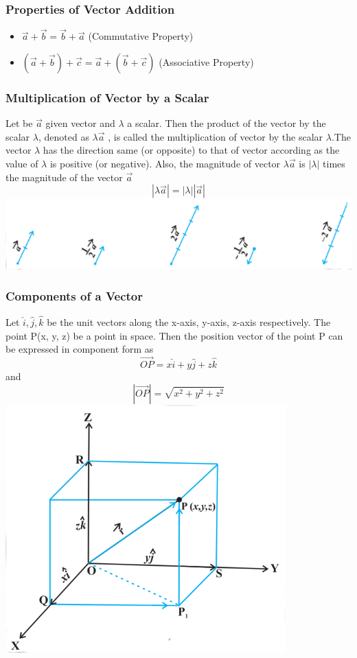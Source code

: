\documentclass[12pt]{article}
\begin{document}
\begin{multicols*}{2}
\subsubsection*{Properties of Vector Addition}
\begin{itemize}
    \item $\vec{a}+\vec{b}=\vec{b}+\vec{a}$ (Commutative Property)
    \item $ (\vec{a} + \vec{b})+\vec{c}=\vec{a}+(\vec{b}+\vec{c})$ (Associative Property)
\end{itemize}

\subsubsection*{Multiplication of Vector by a Scalar}
Let be $\vec{a}$ given vector and $\lambda$ a scalar. Then the product of the vector by the scalar
$\lambda$, denoted as $\lambda \vec{a}$ , is called the multiplication of vector by the scalar $\lambda$.The vector $\lambda$ has the direction same (or
opposite) to that of vector according as the value of $\lambda$ is positive (or negative). Also,
the magnitude of vector $\lambda \vec{a}$ is $| \lambda |$ times the magnitude of the vector $\vec{a}$ $$|\lambda \vec{a}|=|\lambda||\vec{a}|$$
\includegraphics*[scale=0.37]{7.png}

\subsubsection*{Components of a Vector}
Let $\hat{i}, \hat{j}, \hat{k}$ be the unit vectors along the x-axis, y-axis, z-axis respectively. The point P(x, y, z) be a point in space. Then the position vector of the point P can be expressed in component form as $$\vec{OP}=x \hat{i}+y \hat{j}+z \hat{k}$$ and $$|\vec{OP}|=\sqrt{x^2+ y^2+z^2}$$
\includegraphics*[scale=0.5]{8.png}


\end{multicols*}
\end{document}
